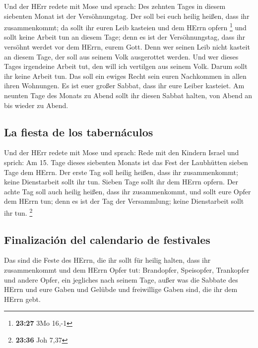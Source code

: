  Und der HErr redete mit Mose und sprach: 
Des zehnten Tages in diesem siebenten Monat ist der Versöhnungstag. Der
soll bei euch heilig heißen, dass ihr zusammenkommt; da sollt ihr euren
Leib kasteien und dem HErrn opfern \footnote{\textbf{23:27} 3Mo 16,-1}
 und sollt keine Arbeit tun an diesem Tage; denn es ist
der Versöhnungstag, dass ihr versöhnt werdet vor dem HErrn, eurem Gott.
 Denn wer seinen Leib nicht kasteit an diesem Tage, der
soll aus seinem Volk ausgerottet werden.  Und wer dieses
Tages irgendeine Arbeit tut, den will ich vertilgen aus seinem Volk.
 Darum sollt ihr keine Arbeit tun. Das soll ein ewiges
Recht sein euren Nachkommen in allen ihren Wohnungen.  Es
ist euer großer Sabbat, dass ihr eure Leiber kasteiet. Am neunten Tage
des Monats zu Abend sollt ihr diesen Sabbat halten, von Abend an bis
wieder zu Abend.

\hypertarget{la-fiesta-de-los-tabernuxe1culos}{%
\subsection{La fiesta de los
tabernáculos}\label{la-fiesta-de-los-tabernuxe1culos}}

 Und der HErr redete mit Mose und sprach: 
Rede mit den Kindern Israel und sprich: Am 15. Tage dieses siebenten
Monats ist das Fest der Laubhütten sieben Tage dem HErrn.
 Der erste Tag soll heilig heißen, dass ihr
zusammenkommt; keine Dienstarbeit sollt ihr tun.  Sieben
Tage sollt ihr dem HErrn opfern. Der achte Tag soll auch heilig heißen,
dass ihr zusammenkommt, und sollt eure Opfer dem HErrn tun; denn es ist
der Tag der Versammlung; keine Dienstarbeit sollt ihr tun. \footnote{\textbf{23:36}
  Joh 7,37}

\hypertarget{finalizaciuxf3n-del-calendario-de-festivales}{%
\subsection{Finalización del calendario de
festivales}\label{finalizaciuxf3n-del-calendario-de-festivales}}

 Das sind die Feste des HErrn, die ihr sollt für heilig
halten, dass ihr zusammenkommt und dem HErrn Opfer tut: Brandopfer,
Speisopfer, Trankopfer und andere Opfer, ein jegliches nach seinem Tage,
 außer was die Sabbate des HErrn und eure Gaben und
Gelübde und freiwillige Gaben sind, die ihr dem HErrn gebt.

